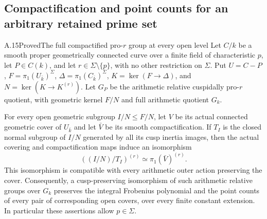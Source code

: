 \subsection{Compactification and point counts for an arbitrary retained prime set}

\begin{claim}{A.15}{Proved}{The full compactified pro-$r$ group at every open level}
Let $C/k$ be a smooth proper geometrically connected curve over a
finite field of characteristic $p$, let $P\in C(k)$, and let
$r\in\Sigma\setminus\{p\}$, with no other restriction on $\Sigma$.
Put $U=C-P$, $F=\pi_1(U_{\bar k})^\Sigma$,
$\Delta=\pi_1(C_{\bar k})^\Sigma$, $K=\ker(F\to\Delta)$, and
$N=\ker(K\to K^{(r)})$. Let $G_P$ be the arithmetic relative
cuspidally pro-$r$ quotient, with geometric kernel $F/N$ and full
arithmetic quotient $G_k$.

For every open geometric subgroup $I/N\le F/N$, let $V$ be its
actual connected geometric cover of $U_{\bar k}$ and let $\bar V$
be its smooth compactification. If $T_I$ is the closed normal
subgroup of $I/N$ generated by all its cusp inertia images, then
the actual covering and compactification maps induce an isomorphism
\[
             ((I/N)/T_I)^{(r)}\simeq\pi_1(\bar V)^{(r)}.
\]
This isomorphism is compatible with every arithmetic outer action
preserving the cover. Consequently, a cusp-preserving isomorphism
of such arithmetic relative groups over $G_k$ preserves the
integral Frobenius polynomial and the point counts of every pair
of corresponding open covers, over every finite constant extension.
In particular these assertions allow $p\in\Sigma$.
\end{claim}

